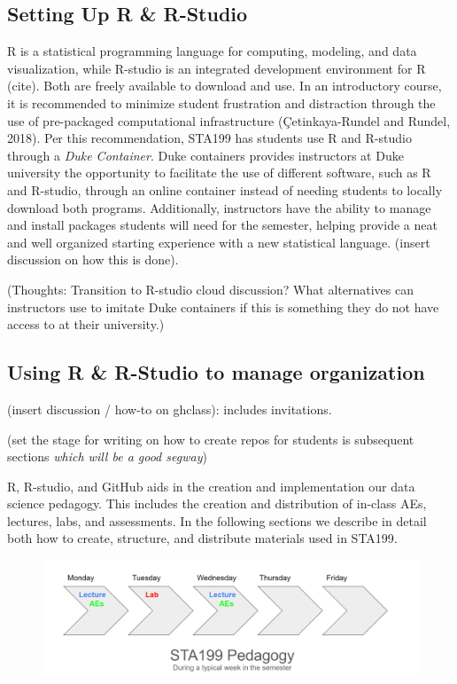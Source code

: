 \documentclass[
  12pt]{article}
\begin{document}
\hypertarget{setting-up-r-r-studio}{%
\subsection{Setting Up R \& R-Studio}\label{setting-up-r-r-studio}}

R is a statistical programming language for computing, modeling, and
data visualization, while R-studio is an integrated development
environment for R (cite). Both are freely available to download and use.
In an introductory course, it is recommended to minimize student
frustration and distraction through the use of pre-packaged
computational infrastructure (Çetinkaya-Rundel and Rundel, 2018). Per
this recommendation, STA199 has students use R and R-studio through a
\emph{Duke Container}. Duke containers provides instructors at Duke
university the opportunity to facilitate the use of different software,
such as R and R-studio, through an online container instead of needing
students to locally download both programs. Additionally, instructors
have the ability to manage and install packages students will need for
the semester, helping provide a neat and well organized starting
experience with a new statistical language. (insert discussion on how
this is done).

(Thoughts: Transition to R-studio cloud discussion? What alternatives
can instructors use to imitate Duke containers if this is something they
do not have access to at their university.)

\hypertarget{using-r-r-studio-to-manage-organization}{%
\subsection{Using R \& R-Studio to manage
organization}\label{using-r-r-studio-to-manage-organization}}

(insert discussion / how-to on ghclass): includes invitations.

(set the stage for writing on how to create repos for students is
subsequent sections \emph{which will be a good segway})

R, R-studio, and GitHub aids in the creation and implementation our data
science pedagogy. This includes the creation and distribution of
in-class AEs, lectures, labs, and assessments. In the following sections
we describe in detail both how to create, structure, and distribute
materials used in STA199.

\begin{figure}

{\centering \includegraphics{images/pedagogy.png}

}

\end{figure}
\end{document}
